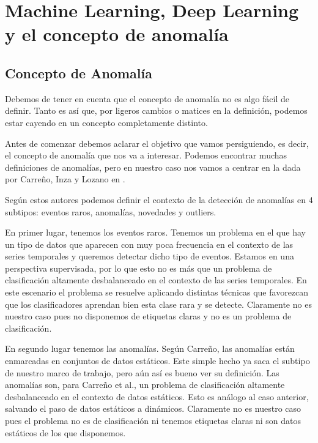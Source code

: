 \part{Machine Learning, Deep Learning y el concepto de anomalía}
\label{part:machine_learning_deep_learning_anomalia}

\chapter{Concepto de Anomalía}
\label{chapter:anomalia}

Debemos de tener en cuenta que el concepto de anomalía no es algo fácil de definir. Tanto es así que, por ligeros cambios o matices en la definición, podemos estar cayendo en un concepto completamente distinto.

Antes de comenzar debemos aclarar el objetivo que vamos persiguiendo, es decir, el concepto de anomalía que nos va a interesar. Podemos encontrar muchas definiciones de anomalías, pero en nuestro caso nos vamos a centrar en la dada por Carreño, Inza y Lozano en \cite{ander_analyzing_2019}.

Según estos autores podemos definir el contexto de la detección de anomalías en 4 subtipos: eventos raros, anomalías, novedades y outliers. 

En primer lugar, tenemos los eventos raros. Tenemos un problema en el que hay un tipo de datos que aparecen con muy poca frecuencia en el contexto de las series temporales y queremos detectar dicho tipo de eventos. Estamos en una perspectiva supervisada, por lo que esto no es más que un problema de clasificación altamente desbalanceado en el contexto de las series temporales. En este escenario el problema se resuelve aplicando distintas técnicas que favorezcan que los clasificadores aprendan bien esta clase rara y se detecte. Claramente no es nuestro caso pues no disponemos de etiquetas claras y no es un problema de clasificación.

En segundo lugar tenemos las anomalías. Según Carreño, las anomalías están enmarcadas en conjuntos de datos estáticos. Este simple hecho ya saca el subtipo de nuestro marco de trabajo, pero aún así es bueno ver su definición. Las anomalías son, para Carreño et al., un problema de clasificación altamente desbalanceado en el contexto de datos estáticos. Esto es análogo al caso anterior, salvando el paso de datos estáticos a dinámicos. Claramente no es nuestro caso pues el problema no es de clasificación ni tenemos etiquetas claras ni son datos estáticos de los que disponemos.

